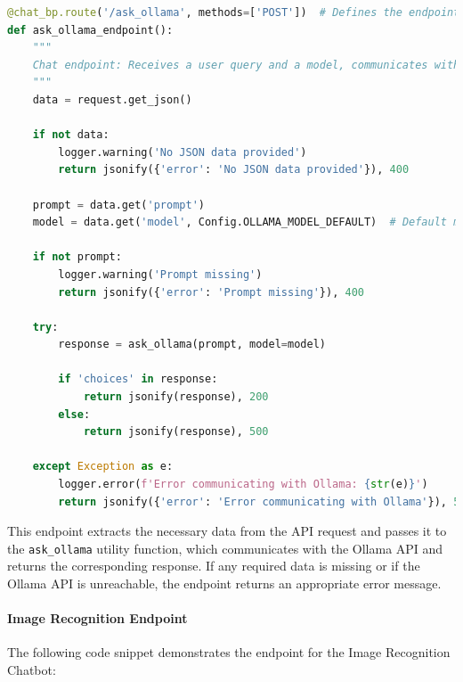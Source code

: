 \begin{lstlisting}[language=Python, caption={Chatbot Endpoint}]
@chat_bp.route('/ask_ollama', methods=['POST'])  # Defines the endpoint
def ask_ollama_endpoint():
    """
    Chat endpoint: Receives a user query and a model, communicates with Ollama, and returns the response.
    """
    data = request.get_json()

    if not data:
        logger.warning('No JSON data provided')
        return jsonify({'error': 'No JSON data provided'}), 400

    prompt = data.get('prompt')
    model = data.get('model', Config.OLLAMA_MODEL_DEFAULT)  # Default model

    if not prompt:
        logger.warning('Prompt missing')
        return jsonify({'error': 'Prompt missing'}), 400

    try:
        response = ask_ollama(prompt, model=model)

        if 'choices' in response:
            return jsonify(response), 200
        else:
            return jsonify(response), 500

    except Exception as e:
        logger.error(f'Error communicating with Ollama: {str(e)}')
        return jsonify({'error': 'Error communicating with Ollama'}), 500
\end{lstlisting}

This endpoint extracts the necessary data from the API request and passes it to the \texttt{ask\_ollama} utility function, which communicates with the Ollama API and returns the corresponding response. If any required data is missing or if the Ollama API is unreachable, the endpoint returns an appropriate error message.

\paragraph{Image Recognition Endpoint}
The following code snippet demonstrates the endpoint for the Image Recognition Chatbot:

